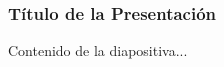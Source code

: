 \documentclass{beamer}
\begin{document}
\begin{frame}
    \frametitle{Título de la Presentación}
    Contenido de la diapositiva...
\end{frame}
\end{document}
